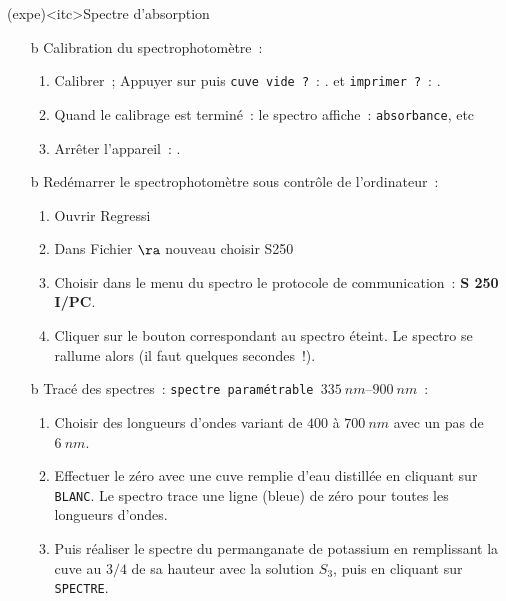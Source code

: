 \documentclass[../main/main.tex]{subfiles}
\begin{document}
{	\begin{tcb}(expe)<itc>{Spectre d'absorption}
		\begin{itemize}
			\item[b]{Calibration du spectrophotomètre}~:
			      \begin{enumerate}
				      \item Calibrer~; Appuyer sur  puis \texttt{cuve vide~?}~:
				            . et \texttt{imprimer~?}~: .
				      \item Quand le calibrage est terminé~: le spectro affiche~:
				            \texttt{absorbance}, etc
				      \item Arrêter l'appareil~: .
			      \end{enumerate}
			\item[b]{Redémarrer le spectrophotomètre sous contrôle de l'ordinateur}~:
			      \begin{enumerate}
				      \item Ouvrir Regressi
				      \item Dans Fichier $\ra$ nouveau choisir S250
				      \item Choisir dans le menu du spectro le protocole de communication~:
				            \textbf{S 250 I/PC}.
				      \item Cliquer sur le bouton correspondant au spectro éteint. Le spectro se
				            rallume alors (il faut quelques secondes~!).
			      \end{enumerate}
			\item[b]{Tracé des spectres}~: \texttt{spectre paramétrable $\SIrange{335}{900}{nm}$}~:
			      \begin{enumerate}
				      \item Choisir des longueurs d'ondes variant de $400$ à $\SI{700}{nm}$ avec
				            un pas de $\SI{6}{nm}$.
				      \item Effectuer le zéro avec une cuve remplie d'eau distillée en cliquant
				            sur \texttt{BLANC}. Le spectro trace une ligne (bleue) de zéro pour
				            toutes les longueurs d'ondes.
				      \item Puis réaliser le spectre du permanganate de potassium en remplissant
				            la cuve au $3/4$ de sa hauteur avec la solution $S_3$, puis en
				            cliquant sur \texttt{SPECTRE}.
			      \end{enumerate}
		\end{itemize}
	\end{tcb}

}
\end{document}
